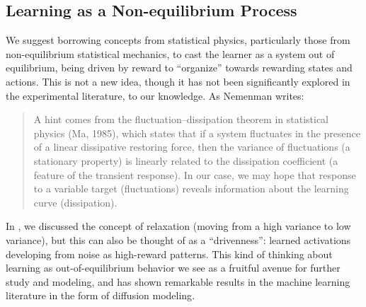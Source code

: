 \documentclass[../main.tex]{subfiles}
\begin{document}








\subsection{Learning as a Non-equilibrium Process}

We suggest borrowing concepts from statistical physics, particularly those from non-equilibrium statistical mechanics, to cast the learner as a system out of equilibrium, being driven by reward to ``organize'' towards rewarding states and actions. This is not a new idea, though it has not been significantly explored in the experimental literature, to our knowledge. As Nemenman writes:
%
\begin{quote}
    A hint comes from the fluctuation–dissipation theorem in statistical physics (Ma, 1985), which states that if a system fluctuates in the presence of a linear dissipative restoring force, then the variance of fluctuations (a stationary property) is linearly related to the dissipation coefficient (a feature of the transient response). In our case, we may hope that response to a variable target (fluctuations) reveals information about the learning curve (dissipation)\cite{nemenmanFluctuationDissipationTheoremModels2005}.
\end{quote}
%
In , we discussed the concept of relaxation (moving from a high variance to low variance), but this can also be thought of as a ``drivenness'': learned activations developing from noise as high-reward patterns. This kind of thinking about learning as out-of-equilibrium behavior we see as a fruitful avenue for further study and modeling, and has shown remarkable results in the machine learning literature in the form of diffusion modeling\cite{sohl-dicksteinDeepUnsupervisedLearning2015}.





\end{document}
